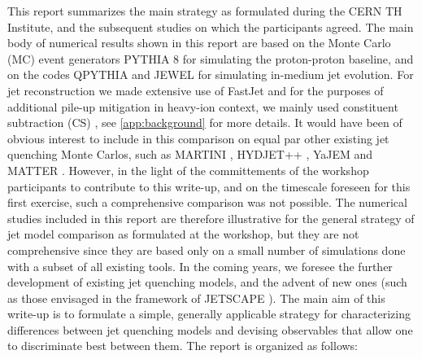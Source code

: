This report summarizes the main strategy as formulated during the CERN TH Institute, and the subsequent studies on which the participants agreed. 
The main body of numerical results shown in this report are based 
on  the Monte Carlo (MC) event generators PYTHIA 8 \cite{Sjostrand:2007gs} for simulating the proton-proton baseline, and on the 
codes QPYTHIA \cite{Armesto:2009fj} and JEWEL \cite{Zapp:2011ya,Zapp:2012ak} for simulating in-medium jet evolution.
  For jet reconstruction we made extensive use of FastJet \cite{Cacciari:2005hq,Cacciari:2011ma} and for the purposes of additional pile-up mitigation in heavy-ion context, we mainly used constituent subtraction (CS) \cite{Berta:2014eza}, see \autoref{app:background} for more details.
It would have been of obvious interest to include in this comparison on equal par other existing jet quenching Monte Carlos, such as MARTINI \cite{Schenke:2009gb,Young:2011ug}, HYDJET++ \cite{Lokhtin:2008xi}, YaJEM \cite{Renk:2010zx} and MATTER \cite{Majumder:2013re}. However, in the light of the committements of the workshop participants 
to contribute to this write-up, and on the timescale foreseen for this first exercise, such a comprehensive comparison was not possible. 
The numerical studies included in this report are therefore illustrative for the general strategy of jet model comparison as formulated at the workshop, 
but they are not comprehensive since they are based only on a small number of simulations done with a subset of all existing tools. In the coming years,
we  foresee the further development of existing jet quenching models, and the advent of new ones (such as those envisaged in the framework of 
JETSCAPE \cite{Cao:2017zih}). The main aim of this write-up is to formulate a simple, generally applicable strategy for characterizing differences
between jet quenching models and devising observables that allow one to discriminate best between them. The report is organized as follows:

